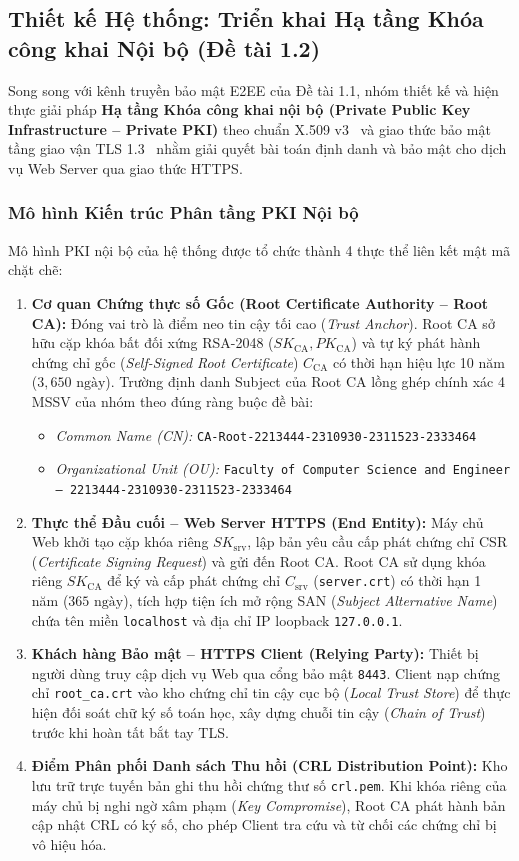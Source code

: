 \documentclass[a4paper,12pt]{article}
\begin{document}
\subsection{Thiết kế Hệ thống: Triển khai Hạ tầng Khóa công khai Nội bộ (Đề tài 1.2)}
Song song với kênh truyền bảo mật E2EE của Đề tài 1.1, nhóm thiết kế và hiện thực giải pháp \textbf{Hạ tầng Khóa công khai nội bộ (Private Public Key Infrastructure -- Private PKI)} theo chuẩn X.509 v3~\cite{rfc5280} và giao thức bảo mật tầng giao vận TLS 1.3~\cite{rfc8446} nhằm giải quyết bài toán định danh và bảo mật cho dịch vụ Web Server qua giao thức HTTPS.

\subsubsection{Mô hình Kiến trúc Phân tầng PKI Nội bộ}
Mô hình PKI nội bộ của hệ thống được tổ chức thành 4 thực thể liên kết mật mã chặt chẽ:
\begin{enumerate}
    \item \textbf{Cơ quan Chứng thực số Gốc (Root Certificate Authority -- Root CA):} Đóng vai trò là điểm neo tin cậy tối cao (\textit{Trust Anchor}). Root CA sở hữu cặp khóa bất đối xứng RSA-2048 ($SK_{\text{CA}}, PK_{\text{CA}}$) và tự ký phát hành chứng chỉ gốc (\textit{Self-Signed Root Certificate}) $C_{\text{CA}}$ có thời hạn hiệu lực 10 năm ($3,650\text{ ngày}$). Trường định danh Subject của Root CA lồng ghép chính xác 4 MSSV của nhóm theo đúng ràng buộc đề bài:
    \begin{itemize}
        \item \textit{Common Name (CN):} \texttt{CA-Root-2213444-2310930-2311523-2333464}
        \item \textit{Organizational Unit (OU):} \texttt{Faculty of Computer Science and Engineer – 2213444-2310930-2311523-2333464}
    \end{itemize}
    \item \textbf{Thực thể Đầu cuối -- Web Server HTTPS (End Entity):} Máy chủ Web khởi tạo cặp khóa riêng $SK_{\text{srv}}$, lập bản yêu cầu cấp phát chứng chỉ CSR (\textit{Certificate Signing Request}) và gửi đến Root CA. Root CA sử dụng khóa riêng $SK_{\text{CA}}$ để ký và cấp phát chứng chỉ $C_{\text{srv}}$ (\texttt{server.crt}) có thời hạn 1 năm ($365\text{ ngày}$), tích hợp tiện ích mở rộng SAN (\textit{Subject Alternative Name}) chứa tên miền \texttt{localhost} và địa chỉ IP loopback \texttt{127.0.0.1}.
    \item \textbf{Khách hàng Bảo mật -- HTTPS Client (Relying Party):} Thiết bị người dùng truy cập dịch vụ Web qua cổng bảo mật \texttt{8443}. Client nạp chứng chỉ \texttt{root\_ca.crt} vào kho chứng chỉ tin cậy cục bộ (\textit{Local Trust Store}) để thực hiện đối soát chữ ký số toán học, xây dựng chuỗi tin cậy (\textit{Chain of Trust}) trước khi hoàn tất bắt tay TLS.
    \item \textbf{Điểm Phân phối Danh sách Thu hồi (CRL Distribution Point):} Kho lưu trữ trực tuyến bản ghi thu hồi chứng thư số \texttt{crl.pem}. Khi khóa riêng của máy chủ bị nghi ngờ xâm phạm (\textit{Key Compromise}), Root CA phát hành bản cập nhật CRL có ký số, cho phép Client tra cứu và từ chối các chứng chỉ bị vô hiệu hóa.
\end{enumerate}
\end{document}
